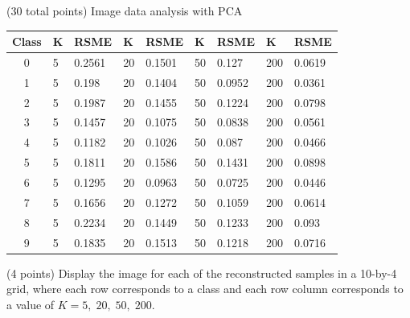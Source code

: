 \documentclass[12pt]{article}
\begin{document}
\begin{question}{(30 total points) Image data analysis with PCA}
\begin{subquestion}
     

      \begin{answerbox}{25em}
         \centering
        \begin{tabular}{|c|l|l|l|l|l|l|l|l|}
            \hline
            \textbf{Class} & \textbf{K} & \textbf{RSME} & \textbf{K} & \textbf{RSME} & \textbf{K} & \textbf{RSME} & \textbf{K} & \textbf{RSME}   \\ \hline
            0     & 5 & 0.2561 & 20 & 0.1501 & 50 & 0.127 & 200 & 0.0619 \\ \hline
            1     & 5 & 0.198 & 20 & 0.1404 & 50 & 0.0952 & 200 & 0.0361 \\ \hline
            2     & 5 & 0.1987 & 20 & 0.1455 & 50 & 0.1224 & 200 & 0.0798 \\ \hline
            3     & 5 & 0.1457 & 20 & 0.1075 & 50 & 0.0838 & 200 & 0.0561 \\ \hline
            4     & 5 & 0.1182 & 20 & 0.1026 & 50 & 0.087 & 200 & 0.0466 \\ \hline
            5     & 5 & 0.1811 & 20 & 0.1586 & 50 & 0.1431 & 200 & 0.0898 \\ \hline
            6     & 5 & 0.1295 & 20 & 0.0963 & 50 & 0.0725 & 200 & 0.0446 \\ \hline
            7     & 5 & 0.1656 & 20 & 0.1272 & 50 & 0.1059 & 200 & 0.0614 \\ \hline
            8     & 5 & 0.2234 & 20 & 0.1449 & 50 & 0.1233 & 200 & 0.093 \\ \hline
            9     & 5 & 0.1835 & 20 & 0.1513 & 50 & 0.1218 & 200 & 0.0716 \\ \hline
        \end{tabular}
      \end{answerbox}
  


   \end{subquestion}
   
   \begin{subquestion}{(4 points)
       Display the image for each of the reconstructed samples in
       a 10-by-4 grid, where each row corresponds to a class and
       each row column corresponds to a value of $K=5, \; 20, \; 50, \; 200$.
     } \label{Q1.7}


   


\end{subquestion}
\end{question}
\end{document}
